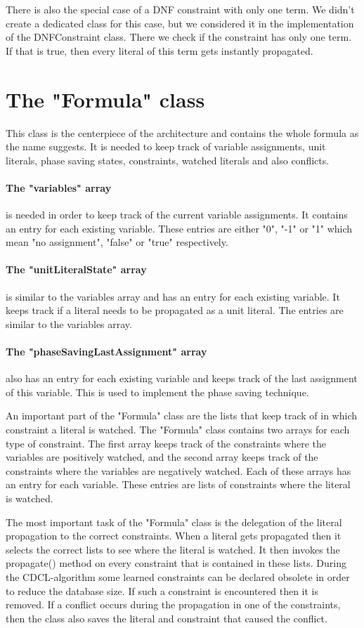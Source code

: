 There is also the special case of a DNF constraint with only one term. We didn't create a dedicated class for this case, but we considered it in the implementation of the DNFConstraint class. There we check if the constraint has only one term. If that is true, then every literal of this term gets instantly propagated.

\section{The "Formula" class}

This class is the centerpiece of the architecture and contains the whole formula as the name suggests. It is needed to keep track of variable assignments, unit literals, phase saving states, constraints, watched literals and also conflicts.
\paragraph{The "variables" array} is needed in order to keep track of the current variable assignments. It contains an entry for each existing variable. These entries are either "0", "-1" or "1" which mean "no assignment", "false" or "true" respectively.
\paragraph{The "unitLiteralState" array} is similar to the variables array and has an entry for each existing variable. It keeps track if a literal needs to be propagated as a unit literal. The entries are similar to the variables array.
\paragraph{The "phaseSavingLastAssignment" array} also has an entry for each existing variable and keeps track of the last assignment of this variable. This is used to implement the phase saving technique.
\par
An important part of the "Formula" class are the lists that keep track of in which constraint a literal is watched. The "Formula" class contains two arrays for each type of constraint. The first array keeps track of the constraints where the variables are positively watched, and the second array keeps track of the constraints where the variables are negatively watched. Each of these arrays has an entry for each variable. These entries are lists of constraints where the literal is watched.
\par
The most important task of the "Formula" class is the delegation of the literal propagation to the correct constraints. When a literal gets propagated then it selects the correct lists to see where the literal is watched. It then invokes the propagate() method on every constraint that is contained in these lists. During the CDCL-algorithm some learned constraints can be declared obsolete in order to reduce the database size. If such a constraint is encountered then it is removed. If a conflict occurs during the propagation in one of the constraints, then the class also saves the literal and constraint that caused the conflict.

